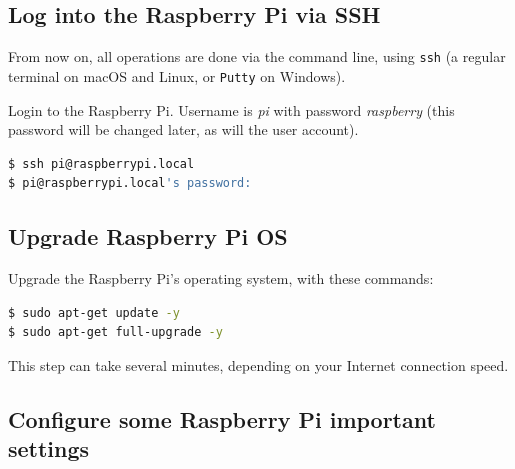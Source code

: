 \documentclass[12pt]{article}
\begin{document}
\subsection{Log into the Raspberry Pi via SSH}

From now on, all operations are done via the command line, using \lstinline{ssh} (a regular terminal on macOS and Linux, or \lstinline{Putty} on Windows).

Login to the Raspberry Pi.
Username is \emph{pi} with password \emph{raspberry} (this password will be changed later, as will the user account).

\begin{lstlisting}[language=bash]
$ ssh pi@raspberrypi.local
$ pi@raspberrypi.local's password:
\end{lstlisting}

\subsection{Upgrade Raspberry Pi OS}

Upgrade the Raspberry Pi's operating system, with these commands:
\begin{lstlisting}[language=bash]
$ sudo apt-get update -y
$ sudo apt-get full-upgrade -y
\end{lstlisting}

This step can take several minutes, depending on your Internet connection speed.

\subsection{Configure some Raspberry Pi important settings}
\end{document}
